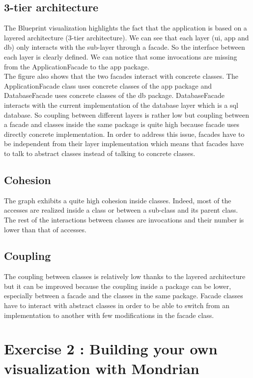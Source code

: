 \documentclass[a4paper,10pt]{article}
\begin{document}
\subsection{3-tier architecture}
The Blueprint visualization highlights the fact that the application is based on a layered architecture (3-tier architecture). We can see that each layer (ui, app and db) only interacts with the sub-layer through a facade. So the interface between each layer is clearly defined. We can notice that some invocations are missing from the ApplicationFacade to the app package.\\
The figure also shows that the two facades interact with concrete classes. The ApplicationFacade class uses concrete classes of the app package and DatabaseFacade uses concrete classes of the db package. DatabaseFacade interacts with the current implementation of the database layer which is a sql database. So coupling between different layers is rather low but coupling between a facade and classes inside the same package is quite high because facade uses directly concrete implementation. In order to address this issue, facades have to be independent from their layer implementation which means that facades have to talk to abstract classes instead of talking to concrete classes.

\subsection{Cohesion}
The graph exhibits a quite high cohesion inside classes. Indeed, most of the accesses are realized inside a class or between a sub-class and its parent class. The rest of the interactions between classes are invocations and their number is lower than that of accesses.

\subsection{Coupling}
The coupling between classes is relatively low thanks to the layered architecture but it can be improved because the coupling inside a package can be lower, especially between a facade and the classes in the same package. Facade classes have to interact with abstract classes in order to be able to switch from an implementation to another with few modifications in the facade class.

\section{Exercise 2 : Building your own visualization with Mondrian}
\end{document}
